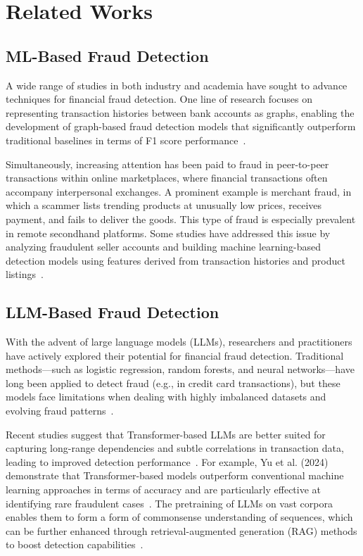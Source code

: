 \documentclass[sigconf]{acmart}
\begin{document}
\section{Related Works}\label{related_work}
\subsection{ML-Based Fraud Detection}
A wide range of studies in both industry and academia have sought to advance techniques for financial fraud detection. One line of research focuses on representing transaction histories between bank accounts as graphs, enabling the development of graph-based fraud detection models that significantly outperform traditional baselines in terms of F1 score performance~\cite{lin2024graphtransformer, yoo2023medicare}.

Simultaneously, increasing attention has been paid to fraud in peer-to-peer transactions within online marketplaces, where financial transactions often accompany interpersonal exchanges. A prominent example is merchant fraud, in which a scammer lists trending products at unusually low prices, receives payment, and fails to deliver the goods. This type of fraud is especially prevalent in remote secondhand platforms. Some studies have addressed this issue by analyzing fraudulent seller accounts and building machine learning-based detection models using features derived from transaction histories and product listings~\cite{hasan2022ecommerce, renjith2018}.

\subsection{LLM-Based Fraud Detection}  
With the advent of large language models (LLMs), researchers and practitioners have actively explored their potential for financial fraud detection. Traditional methods—such as logistic regression, random forests, and neural networks—have long been applied to detect fraud (e.g., in credit card transactions), but these models face limitations when dealing with highly imbalanced datasets and evolving fraud patterns~\cite{yu2024card_fds}.

Recent studies suggest that Transformer-based LLMs are better suited for capturing long-range dependencies and subtle correlations in transaction data, leading to improved detection performance~\cite{chen2021pareto, liu2019stockline}. For example, Yu et al. (2024) demonstrate that Transformer-based models outperform conventional machine learning approaches in terms of accuracy and are particularly effective at identifying rare fraudulent cases~\cite{yu2024card_fds, lyu2023attention}. The pretraining of LLMs on vast corpora enables them to form a form of commonsense understanding of sequences, which can be further enhanced through retrieval-augmented generation (RAG) methods to boost detection capabilities~\cite{pandey2024rag}.
\end{document}

